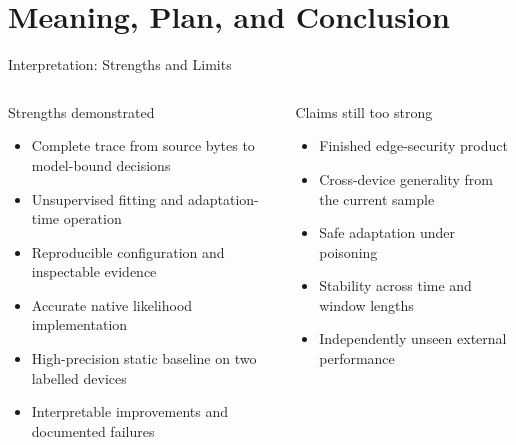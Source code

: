 \documentclass[aspectratio=169,10pt]{beamer}
\begin{document}
\section{Meaning, Plan, and Conclusion}

\begin{frame}{Interpretation: Strengths and Limits}
\begin{columns}[T,onlytextwidth]
\begin{exampleblock}{Strengths demonstrated}
\begin{itemize}
  \item Complete trace from source bytes to model-bound decisions
  \item Unsupervised fitting and adaptation-time operation
  \item Reproducible configuration and inspectable evidence
  \item Accurate native likelihood implementation
  \item High-precision static baseline on two labelled devices
  \item Interpretable improvements and documented failures
\end{itemize}
\end{exampleblock}

\begin{alertblock}{Claims still too strong}
\begin{itemize}
  \item Finished edge-security product
  \item Cross-device generality from the current sample
  \item Safe adaptation under poisoning
  \item Stability across time and window lengths
  \item Independently unseen external performance
\end{itemize}
\end{alertblock}
\end{columns}
\end{frame}
\end{document}
